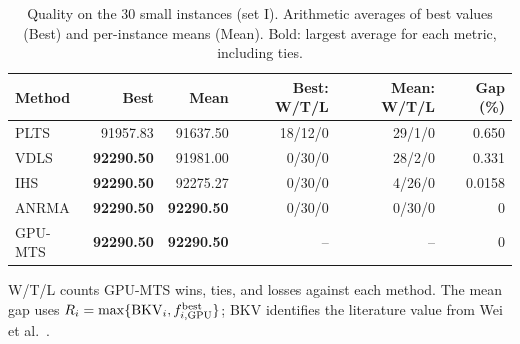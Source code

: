 \begin{table}[tbp]\centering\small
\caption{Quality on the 30 small instances (set I). Arithmetic averages of best values (Best) and per-instance means (Mean). Bold: largest average for each metric, including ties.}
\label{tab:benchmark-small}
\begin{tabular}{lrrrrr}
\toprule
Method & Best & Mean & Best: W/T/L & Mean: W/T/L & Gap (\%)\\
\midrule
PLTS & 91957.83 & 91637.50 & 18/12/0 & 29/1/0 & 0.650\\
VDLS & \textbf{92290.50} & 91981.00 & 0/30/0 & 28/2/0 & 0.331\\
IHS & \textbf{92290.50} & 92275.27 & 0/30/0 & 4/26/0 & 0.0158\\
ANRMA & \textbf{92290.50} & \textbf{92290.50} & 0/30/0 & 0/30/0 & 0\\
GPU-MTS & \textbf{92290.50} & \textbf{92290.50} & -- & -- & 0\\
\bottomrule\end{tabular}
\par\smallskip\parbox{.97\linewidth}{\footnotesize W/T/L counts GPU-MTS wins, ties, and losses against each method. The mean gap uses $R_i=\max\{\mathrm{BKV}_i,f^{\mathrm{best}}_{i,\rm GPU}\}$; BKV identifies the literature value from Wei et al.~\cite{Wei2026ANRMA}.}
\end{table}
